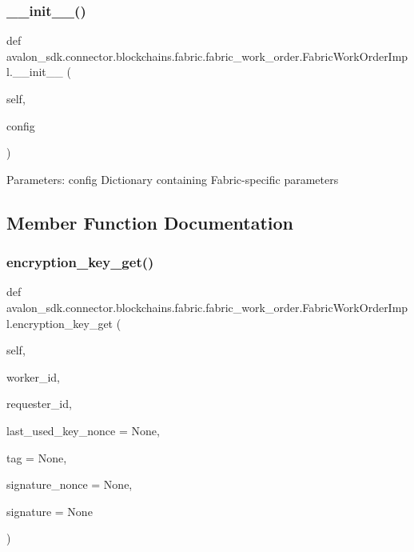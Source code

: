 \subsubsection{\texorpdfstring{\+\_\+\+\_\+init\+\_\+\+\_\+()}{\_\_init\_\_()}}
{\footnotesize\ttfamily def avalon\+\_\+sdk.\+connector.\+blockchains.\+fabric.\+fabric\+\_\+work\+\_\+order.\+Fabric\+Work\+Order\+Impl.\+\_\+\+\_\+init\+\_\+\+\_\+ (\begin{DoxyParamCaption}\item[{}]{self,  }\item[{}]{config }\end{DoxyParamCaption})}

\begin{DoxyVerb}Parameters:
config    Dictionary containing Fabric-specific parameters
\end{DoxyVerb}
 

\subsection{Member Function Documentation}
\mbox{\label{classavalon__sdk_1_1connector_1_1blockchains_1_1fabric_1_1fabric__work__order_1_1FabricWorkOrderImpl_a2ed8cad5b78efad2c599499f5615117a}} 
\subsubsection{\texorpdfstring{encryption\+\_\+key\+\_\+get()}{encryption\_key\_get()}}
{\footnotesize\ttfamily def avalon\+\_\+sdk.\+connector.\+blockchains.\+fabric.\+fabric\+\_\+work\+\_\+order.\+Fabric\+Work\+Order\+Impl.\+encryption\+\_\+key\+\_\+get (\begin{DoxyParamCaption}\item[{}]{self,  }\item[{}]{worker\+\_\+id,  }\item[{}]{requester\+\_\+id,  }\item[{}]{last\+\_\+used\+\_\+key\+\_\+nonce = {\ttfamily None},  }\item[{}]{tag = {\ttfamily None},  }\item[{}]{signature\+\_\+nonce = {\ttfamily None},  }\item[{}]{signature = {\ttfamily None} }\end{DoxyParamCaption})}


